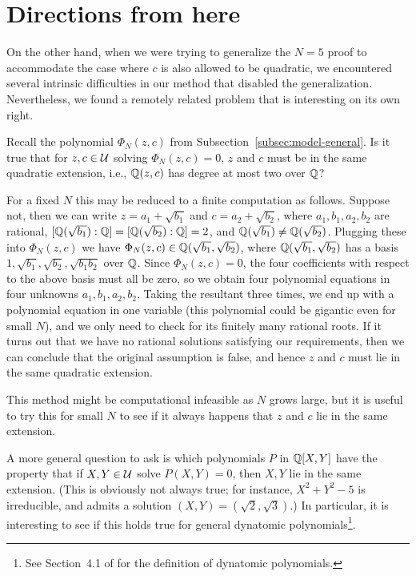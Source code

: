 \section{Directions from here}
\label{sec:map}

On the other hand, when we were trying to generalize the $N = 5$ proof
to accommodate the case where $c$ is also allowed to be quadratic, we
encountered several intrinsic difficulties in our method that disabled
the generalization. Nevertheless, we found a remotely related problem
that is interesting on its own right.

\begin{question}
  \label{q:z-c-same-extension}
  Recall the polynomial $\Phi_N(z, c)$ from
  Subsection~\ref{subsec:model-general}. Is it true that for $z, c \in
  \mathcal{U}$ solving $\Phi_N(z, c) = 0$, $z$ and $c$ must be in the same
  quadratic extension, i.e., $\mathbb{Q}(z, c)$ has degree at most two over
  $\mathbb{Q}$?
\end{question}

For a fixed $N$ this may be reduced to a finite computation as
follows. Suppose not, then we can write $z = a_1 + \sqrt{b_1}$ and $c
= a_2 + \sqrt{b_2}$, where $a_1, b_1, a_2, b_2$ are rational,
$[\mathbb{Q}(\sqrt{b_1}) : \mathbb{Q}] = [\mathbb{Q}(\sqrt{b_2}) : \mathbb{Q}] = 2$, and
$\mathbb{Q}(\sqrt{b_1}) \ne \mathbb{Q}(\sqrt{b_2})$. Plugging these into $\Phi_N(z,
c)$ we have $\Phi_N(z, c) \in \mathbb{Q}(\sqrt{b_1}, \sqrt{b_2})$, where
$\mathbb{Q}(\sqrt{b_1}, \sqrt{b_2})$ has a basis $1, \sqrt{b_1}, \sqrt{b_2},
\sqrt{b_1 b_2}$ over $\mathbb{Q}$. Since $\Phi_N(z, c) = 0$, the four
coefficients with respect to the above basis must all be zero, so we
obtain four polynomial equations in four unknowns $a_1, b_1, a_2,
b_2$. Taking the resultant three times, we end up with a polynomial
equation in one variable (this polynomial could be gigantic even for
small $N$), and we only need to check for its finitely many rational
roots. If it turns out that we have no rational solutions satisfying
our requirements, then we can conclude that the original assumption is
false, and hence $z$ and $c$ must lie in the same quadratic extension.

This method might be computational infeasible as $N$
grows large, but it is useful to try this for small $N$ to see if it
always happens that $z$ and $c$ lie in the same extension.

A more general question to ask is which polynomials $P$ in $\mathbb{Q}[X, Y]$
have the property that if $X, Y \in \mathcal{U}$ solve $P(X, Y) = 0$, then $X,
Y$ lie in the same extension. (This is obviously not always true; for
instance, $X^2 + Y^2 - 5$ is irreducible, and admits a solution $(X,
Y) = (\sqrt{2}, \sqrt{3})$.) In particular, it is interesting to see
if this holds true for general dynatomic polynomials\footnote{%
  See Section~4.1 of \cite{MR2316407} for the definition of dynatomic
  polynomials.}.

